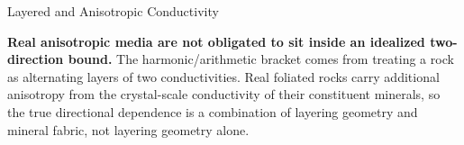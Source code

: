 \begin{activity}{Layered and Anisotropic Conductivity}
\begin{center}
\end{center}

\textbf{Real anisotropic media are not obligated to sit inside an idealized two-direction bound.} The harmonic/arithmetic bracket comes from treating a rock as alternating layers of two conductivities. Real foliated rocks carry additional anisotropy from the crystal-scale conductivity of their constituent minerals, so the true directional dependence is a combination of layering geometry and mineral fabric, not layering geometry alone.

\end{activity}
